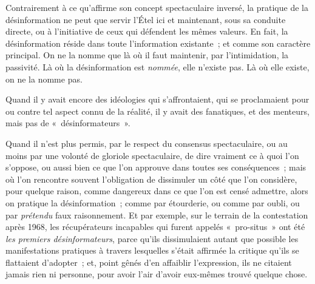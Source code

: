 \documentclass[french,twoside]{book} %
\def\bignobreak{\ifdim\lastskip<\bigskipamount
  \removelastskip\nopagebreak\bigskip\fi}
\newcommand{\labelblock}[1]{\bigbreak{\color{rubric}\noindent\textbf{#1}\par}\bignobreak}
\begin{document}
Contrairement à ce qu’affirme son concept spectaculaire inversé, la pratique de la désinformation ne peut que servir l’Étel ici et maintenant, sous sa conduite directe, ou à l’initiative de ceux qui défendent les mêmes valeurs. En fait, la désinformation réside dans toute l’information existante ; et comme son caractère principal. On ne la nomme que là où il faut maintenir, par l’intimidation, la passivité. Là où la désinformation est \emph{nommée}, elle n’existe pas. Là où elle existe, on ne la nomme pas.\par
Quand il y avait encore des idéologies qui s’affrontaient, qui se proclamaient pour ou contre tel aspect connu de la réalité, il y avait des fanatiques, et des menteurs, mais pas de « désinformateurs ».\par
Quand il n’est plus permis, par le respect du consensus spectaculaire, ou au moins par une volonté de gloriole spectaculaire, de dire vraiment ce à quoi l’on s’oppose, ou aussi bien ce que l’on approuve dans toutes ses conséquences ; mais où l’on rencontre souvent l’obligation de dissimuler un côté que l’on considère, pour quelque raison, comme dangereux dans ce que l’on est censé admettre, alors on pratique la désinformation ; comme par étourderie, ou comme par oubli, ou par \emph{prétendu} faux raisonnement. Et par exemple, sur le terrain de la contestation après 1968, les récupérateurs incapables qui furent appelés « pro-situs » ont été \emph{les premiers désinformateurs}, parce qu’ils dissimulaient autant que possible les manifestations pratiques à travers lesquelles s’était affirmée la critique qu’ils se flattaient d’adopter ; et, point gênés d’en affaiblir l’expression, ils ne citaient jamais rien ni personne, pour avoir l’air d’avoir eux-mêmes trouvé quelque chose.\par

\labelblock{XVII}
\end{document}
